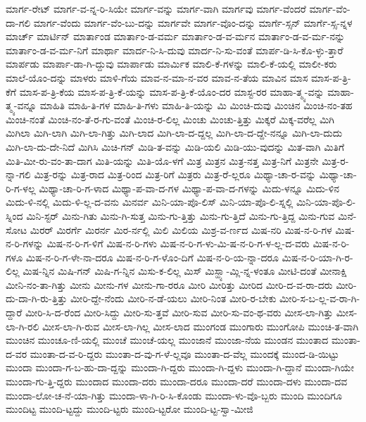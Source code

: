 {ಮಾರ್ಗ-ರೇಟ್
ಮಾರ್ಗ-ವ-ನ್ನ-ರಿ-ಸಿಯೇ
ಮಾರ್ಗ-ವನ್ನು
ಮಾರ್ಗ-ವಾಗಿ
ಮಾರ್ಗವು
ಮಾರ್ಗ-ವೆಂದರೆ
ಮಾರ್ಗ-ವೆಂ-ದಾ-ಗಲಿ
ಮಾರ್ಗ-ವೆಂದು
ಮಾರ್ಗ-ವೆಂ-ಬು-ದನ್ನು
ಮಾರ್ಗವೇ
ಮಾರ್ಗ-ವೊಂ-ದನ್ನು
ಮಾರ್ಗೆ-ಸ್ಸನ್
ಮಾರ್ಗೆ-ಸ್ಸ-ನ್ನಳ
ಮಾರ್ಚ್
ಮಾರ್ಟಿನ್
ಮಾರ್ತಾಂಡ
ಮಾರ್ತಾಂ-ಡ-ವರ್ಮ
ಮಾರ್ತಾಂ-ಡ-ವ-ರ್ಮನ
ಮಾರ್ತಾಂ-ಡ-ವ-ರ್ಮ-ನನ್ನು
ಮಾರ್ತಾಂ-ಡ-ವ-ರ್ಮ-ನಿಗೆ
ಮಾರ್ಥಾ
ಮಾರ್ದ-ನಿ-ಸಿ-ದುವು
ಮಾರ್ದ-ನಿ-ಸು-ವಂತೆ
ಮಾರ್ಪ-ಡಿ-ಸಿ-ಕೊ-ಳ್ಳು-ತ್ತಾರೆ
ಮಾರ್ಪಡು
ಮಾರ್ಪಾ-ಡಾ-ಗಿ-ದ್ದುವು
ಮಾರ್ಪಾಡು
ಮಾರ್ಮಿಕ
ಮಾಲಿ-ಕೆ-ಗಳನ್ನು
ಮಾಲಿ-ಕೆ-ಯಲ್ಲಿ
ಮಾಲೀ-ಕರು
ಮಾಲೆ-ಯೊಂ-ದನ್ನು
ಮಾಳರು
ಮಾಳಿ-ಗೆಯ
ಮಾವ-ನ-ಮಾ-ನ-ವರ
ಮಾವ-ನ-ತೆಯ
ಮಾವಿನ
ಮಾಸ
ಮಾಸ-ಪ-ತ್ರಿ-ಕೆಗೆ
ಮಾಸ-ಪ-ತ್ರಿ-ಕೆಯ
ಮಾಸ-ಪ-ತ್ರಿ-ಕೆ-ಯನ್ನು
ಮಾಸ-ಪ-ತ್ರಿ-ಕೆ-ಯೊಂ-ದರ
ಮಾಸ್ಟ-ರರ
ಮಾಹಾ-ತ್ಮ್ಯ-ವನ್ನು
ಮಾಹಾ-ತ್ಮ್ಯ-ವನ್ನೂ
ಮಾಹಿತಿ
ಮಾಹಿ-ತಿ-ಗಳ
ಮಾಹಿ-ತಿ-ಗಳು
ಮಾಹಿ-ತಿ-ಯನ್ನು
ಮಿ
ಮಿಂಚಿ-ದುವು
ಮಿಂಚಿನ
ಮಿಂಚಿ-ನಂ-ತಹ
ಮಿಂಚಿ-ನಂತೆ
ಮಿಂಚಿ-ನಂ-ತೆ-ರ-ಗು-ವಂತೆ
ಮಿಂಚಿ-ರ-ಲಿಲ್ಲ
ಮಿಂಚು
ಮಿಂಚು-ತ್ತಿತ್ತು
ಮಿಕ್ಕರೆ
ಮಿಕ್ಕ-ವರೆಲ್ಲ
ಮಿಗಿ
ಮಿಗಿಲಾ
ಮಿಗಿ-ಲಾಗಿ
ಮಿಗಿ-ಲಾ-ಗಿತ್ತು
ಮಿಗಿ-ಲಾದ
ಮಿಗಿ-ಲಾ-ದ-ದ್ದಲ್ಲ
ಮಿಗಿ-ಲಾ-ದ-ದ್ದೇ-ನನ್ನೂ
ಮಿಗಿ-ಲಾ-ದುದು
ಮಿಗಿ-ಲಾ-ದು-ದೇ-ನಿದೆ
ಮಿಗಿಸಿ
ಮಿಚಿ-ಗನ್
ಮಿಡಿ-ತ-ವನ್ನು
ಮಿಡಿ-ಯಲಿ
ಮಿಡಿ-ಯು-ವುದನ್ನು
ಮಿತ-ವಾಗಿ
ಮಿತಿಗೆ
ಮಿತಿ-ಮೀ-ರು-ವಂ-ತಾ-ದಾಗ
ಮಿತಿ-ಯನ್ನು
ಮಿತಿ-ಯೊ-ಳಗೆ
ಮಿತ್ರ
ಮಿತ್ರನ
ಮಿತ್ರ-ನತ್ತ
ಮಿತ್ರ-ನಿಗೆ
ಮಿತ್ರನೇ
ಮಿತ್ರ-ರ-ನ್ನಾ-ಗಲಿ
ಮಿತ್ರ-ರನ್ನು
ಮಿತ್ರ-ರಾದ
ಮಿತ್ರ-ರಿಂದ
ಮಿತ್ರ-ರಿಗೆ
ಮಿತ್ರರು
ಮಿತ್ರ-ರೆ-ಲ್ಲರೂ
ಮಿಥ್ಯಾ-ಚಾ-ರ-ವನ್ನು
ಮಿಥ್ಯಾ-ಚಾ-ರಿ-ಗ-ಳಲ್ಲ
ಮಿಥ್ಯಾ-ಚಾ-ರಿ-ಗ-ಳಾದ
ಮಿಥ್ಯಾ-ಪ-ವಾ-ದ-ಗಳ
ಮಿಥ್ಯಾ-ಪ-ವಾ-ದ-ಗಳನ್ನು
ಮಿದು-ಳನ್ನೂ
ಮಿದು-ಳಿನ
ಮಿದು-ಳಿ-ನಲ್ಲಿ
ಮಿದು-ಳಿ-ಲ್ಲ-ದ-ವನು
ಮಿನರ್ವ
ಮಿನಿ-ಯಾ-ಪೊ-ಲಿಸ್
ಮಿನಿ-ಯಾ-ಪೊ-ಲಿ-ಸ್ನಲ್ಲಿ
ಮಿನಿ-ಯಾ-ಪೊ-ಲಿ-ಸ್ನಿಂದ
ಮಿನಿ-ಸ್ಟರ್
ಮಿನು-ಗಿತು
ಮಿನು-ಗಿ-ಸುತ್ತ
ಮಿನು-ಗು-ತ್ತಿತ್ತು
ಮಿನು-ಗು-ತ್ತಿದೆ
ಮಿನು-ಗು-ತ್ತಿದ್ದ
ಮಿನು-ಗುವ
ಮಿನೆ-ಸೋಟ
ಮಿರರ್
ಮಿರರ್ಗೆ
ಮಿರರ್ನ
ಮಿರ-ರ್ನಲ್ಲಿ
ಮಿಲಿ
ಮಿಲಿಯ
ಮಿಶ್ರ-ವ-ರ್ಣದ
ಮಿಷ-ನರಿ
ಮಿಷ-ನ-ರಿ-ಗಳ
ಮಿಷ-ನ-ರಿ-ಗಳನ್ನು
ಮಿಷ-ನ-ರಿ-ಗ-ಳಿಗೆ
ಮಿಷ-ನ-ರಿ-ಗಳು
ಮಿಷ-ನ-ರಿ-ಗ-ಳು-ಮಿ-ಷ-ನ-ರಿ-ಗ-ಳ-ಲ್ಲ-ದ-ವರು
ಮಿಷ-ನ-ರಿ-ಗಳೂ
ಮಿಷ-ನ-ರಿ-ಗ-ಳೇ-ನಾ-ದರೂ
ಮಿಷ-ನ-ರಿ-ಗ-ಳೊಂ-ದಿಗೆ
ಮಿಷ-ನ-ರಿ-ಯ-ನ್ನಾ-ದರೂ
ಮಿಷ-ನ-ರಿ-ಯಾ-ಗಿ-ರ-ಲಿಲ್ಲ
ಮಿಷ-ನ್ನಿನ
ಮಿಷಿ-ಗನ್
ಮಿಷಿ-ಗ-ನ್ನಿನ
ಮಿಸು-ಕ-ಲಿಲ್ಲ
ಮಿಸ್
ಮಿಸ್ಹ್ಯಾ-ಮ್ಲಿ-ನ್ನ-ಳಂತೂ
ಮೀಟಿ-ದಂತೆ
ಮೀನಾಕ್ಷಿ
ಮೀನಿ-ನಂ-ತಾ-ಗಿತ್ತು
ಮೀನು
ಮೀನು-ಗಳ
ಮೀನು-ಗಾ-ರರೂ
ಮೀರಿ
ಮೀರಿತ್ತು
ಮೀರಿದ
ಮೀರಿ-ದ-ವ-ರಾ-ದರು
ಮೀರಿ-ದು-ದಾ-ಗಿ-ರು-ತ್ತಿತ್ತು
ಮೀರಿ-ದ್ದೇ-ನೆಂದು
ಮೀರಿ-ನ-ಡೆ-ಯಲು
ಮೀರಿ-ನಿಂತ
ಮೀರಿ-ರ-ಬೇಕು
ಮೀರಿ-ಸ-ಬ-ಲ್ಲ-ವ-ರಾ-ಗಿ-ದ್ದಾರೆ
ಮೀರಿ-ಸಿ-ದ-ರೆಂದ
ಮೀರಿ-ಸಿದ್ದು
ಮೀರಿ-ಸು-ತ್ತವೆ
ಮೀರಿ-ಸುವ
ಮೀರಿ-ಸು-ವಂ-ಥ-ವರು
ಮೀಸ-ಲಾ-ಗಿತ್ತು
ಮೀಸ-ಲಾ-ಗಿ-ರಲಿ
ಮೀಸ-ಲಾ-ಗಿ-ರುವ
ಮೀಸ-ಲಾ-ಗಿಲ್ಲ
ಮೀಸ-ಲಾದ
ಮುಂಗಂಡ
ಮುಂಗಾರು
ಮುಂಗೋಪಿ
ಮುಂಚಿ-ತ-ವಾಗಿ
ಮುಂಚಿನ
ಮುಂಚೂ-ಣಿ-ಯಲ್ಲಿ
ಮುಂಚೆ
ಮುಂಚೆ-ಯಲ್ಲ
ಮುಂಜಾನೆ
ಮುಂಜಾ-ನೆಯ
ಮುಂಡನ
ಮುಂತಾದ
ಮುಂತಾ-ದ-ವರ
ಮುಂತಾ-ದ-ವ-ರಿ-ದ್ದರು
ಮುಂತಾ-ದ-ವು-ಗ-ಳೆ-ಲ್ಲವೂ
ಮುಂತಾ-ದ-ವೆಲ್ಲ
ಮುಂದಕ್ಕೆ
ಮುಂದ-ಡಿ-ಯಿಟ್ಟು
ಮುಂದಾ
ಮುಂದಾ-ಗ-ಬ-ಹು-ದಾ-ದ್ದನ್ನು
ಮುಂದಾ-ಗಿ-ದ್ದರು
ಮುಂದಾ-ಗಿ-ದ್ದಳು
ಮುಂದಾ-ಗಿ-ದ್ದಾನೆ
ಮುಂದಾ-ಗಿಯೇ
ಮುಂದಾ-ಗು-ತ್ತಿ-ದ್ದರು
ಮುಂದಾದ
ಮುಂದಾ-ದರು
ಮುಂದಾ-ದರೂ
ಮುಂದಾ-ದರೆ
ಮುಂದಾ-ದಳು
ಮುಂದಾ-ದವ
ಮುಂದಾ-ಲೋ-ಚ-ನೆ-ಯಾ-ಗಿತ್ತು
ಮುಂದಾ-ಳಾ-ಗಿ-ರಿ-ಸಿ-ಕೊಂಡು
ಮುಂದಾ-ಳು-ವೊ-ಬ್ಬರು
ಮುಂದಿ
ಮುಂದಿಗೂ
ಮುಂದಿಟ್ಟ
ಮುಂದಿ-ಟ್ಟದ್ದು
ಮುಂದಿ-ಟ್ಟರು
ಮುಂದಿ-ಟ್ಟರೋ
ಮುಂದಿ-ಟ್ಟ-ಸ್ವಾ-ಮೀಜಿ
}
